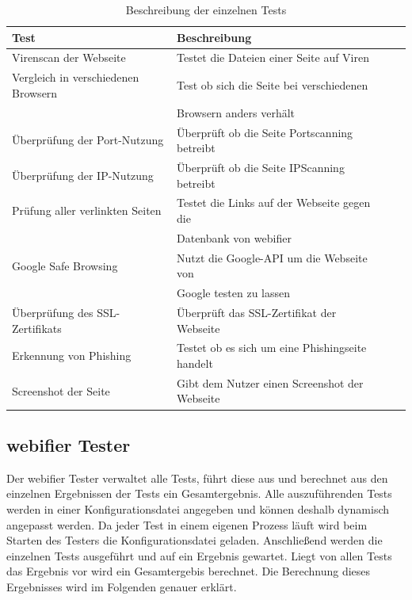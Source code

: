 \begin{table}[H]
\centering
\begin{tabular}{|l|l|l|l|}
\hline
\textbf{Test} & \textbf{Beschreibung} \\\hline
Virenscan der Webseite & Testet die Dateien einer Seite auf Viren \\\hline
Vergleich in verschiedenen Browsern & Test ob sich die Seite bei verschiedenen \\ & Browsern anders verhält \\\hline
Überprüfung der Port-Nutzung & Überprüft ob die Seite Portscanning betreibt \\\hline
Überprüfung der IP-Nutzung & Überprüft ob die Seite IPScanning betreibt \\\hline
Prüfung aller verlinkten Seiten & Testet die Links auf der Webseite gegen die \\ & Datenbank von webifier \\\hline
Google Safe Browsing & Nutzt die Google-API um die Webseite von \\ & Google testen zu lassen \\\hline
Überprüfung des SSL-Zertifikats & Überprüft das SSL-Zertifikat der Webseite \\\hline
Erkennung von Phishing & Testet ob es sich um eine Phishingseite handelt \\\hline
Screenshot der Seite & Gibt dem Nutzer einen Screenshot der Webseite \\\hline
\end{tabular}
\caption{Beschreibung der einzelnen Tests}
\label{tbl:tests}
\end{table}

\subsection{webifier Tester}
\label{sec:konzept-tester}

Der webifier Tester verwaltet alle Tests, führt diese aus und berechnet aus den einzelnen Ergebnissen der Tests ein Gesamtergebnis. Alle auszuführenden Tests werden in einer Konfigurationsdatei angegeben und können deshalb dynamisch angepasst werden. Da jeder Test in einem eigenen Prozess läuft wird beim Starten des Testers die Konfigurationsdatei geladen. Anschließend werden die einzelnen Tests ausgeführt und auf ein Ergebnis gewartet. Liegt von allen Tests das Ergebnis vor wird ein Gesamtergebis berechnet. Die Berechnung dieses Ergebnisses wird im Folgenden genauer erklärt.

